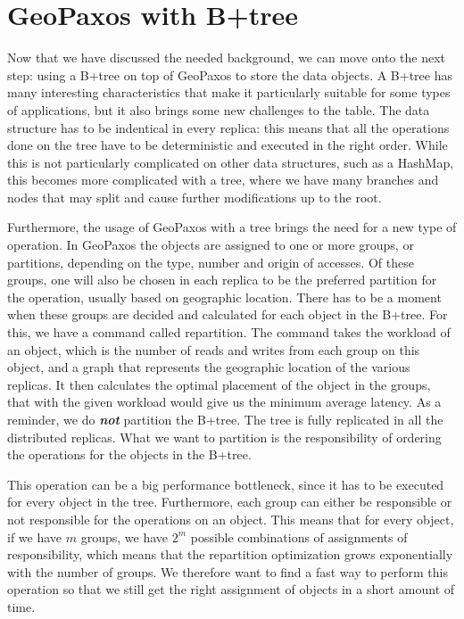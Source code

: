 \chapter{GeoPaxos with B+tree}\label{sec:geopaxos-with-B+tree}
Now that we have discussed the needed background, we can move onto the next step: using a B+tree on top of GeoPaxos to store the data objects. A B+tree has many interesting characteristics that make it particularly suitable for some types of applications, but it also brings some new challenges to the table. The data structure has to be indentical in every replica: this means that all the operations done on the tree have to be deterministic and executed in the right order. While this is not particularly complicated on other data structures, such as a HashMap, this becomes more complicated with a tree, where we have many branches and nodes that may split and cause further modifications up to the root.

Furthermore, the usage of GeoPaxos with a tree brings the need for a new type of operation. In GeoPaxos the objects are assigned to one or more groups, or partitions, depending on the type, number and origin of accesses. Of these groups, one will also be chosen in each replica to be the preferred partition for the operation, usually based on geographic location. There has to be a moment when these groups are decided and calculated for each object in the B+tree. For this, we have a command called repartition. The command takes the workload of an object, which is the number of reads and writes from each group on this object, and a graph that represents the geographic location of the various replicas. It then calculates the optimal placement of the object in the groups, that with the given workload would give us the minimum average latency. As a reminder, we do \textbf{\emph{not}} partition the B+tree. The tree is fully replicated in all the distributed replicas. What we want to partition is the responsibility of ordering the operations for the objects in the B+tree.

This operation can be a big performance bottleneck, since it has to be executed for every object in the tree. Furthermore, each group can either be responsible or not responsible for the operations on an object. This means that for every object, if we have $m$ groups, we have $2^m$ possible combinations of assignments of responsibility, which means that the repartition optimization grows exponentially with the number of groups. We therefore want to find a fast way to perform this operation so that we still get the right assignment of objects in a short amount of time.

